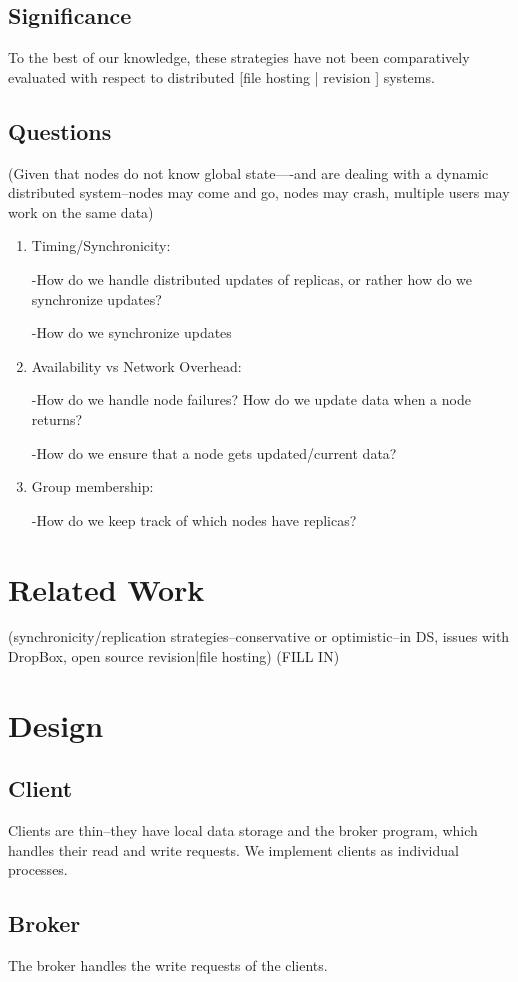 \subsection{Significance}
To the best of our knowledge, these strategies have not been comparatively evaluated with respect to distributed [file hosting | revision ] systems.

\subsection{Questions}
(Given that nodes do not know global state----and are dealing with a dynamic distributed system--nodes may come and go, nodes may crash, multiple users may work on the same data)
\begin{enumerate}
\item Timing/Synchronicity:

-How do we handle distributed updates of replicas, or rather how do we synchronize updates?

-How do we synchronize updates

\item Availability vs Network Overhead:

-How do we handle node failures?  How do we update data when a node returns?

-How do we ensure that a node gets updated/current data?

\item Group membership:

-How do we keep track of which nodes have replicas?
\end{enumerate}

\section{Related Work}
(synchronicity/replication strategies--conservative or optimistic--in DS, issues with DropBox, open source revision|file hosting)
(FILL IN)

\section{Design}
\subsection{Client}
Clients are thin--they have local data storage and the broker program, which handles their read and write requests.
We implement clients as individual processes.
\subsection{Broker}
The broker handles the write requests of the clients.
